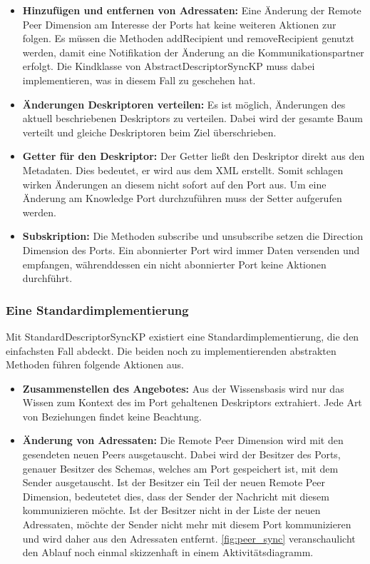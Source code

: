 \documentclass[a4paper]{article}
\begin{document}
	\begin{itemize}
		\item \textbf{Hinzufügen und entfernen von Adressaten:} Eine Änderung
		der Remote Peer Dimension am Interesse der Ports hat keine weiteren
		Aktionen zur folgen. Es müssen die Methoden addRecipient und
		removeRecipient genutzt werden, damit eine Notifikation
		der Änderung an die Kommunikationspartner erfolgt. Die Kindklasse von
		AbstractDescriptorSyncKP muss dabei implementieren, was in diesem
		Fall zu geschehen hat.
		\item \textbf{Änderungen Deskriptoren verteilen:} Es ist möglich, 
		Änderungen des aktuell beschriebenen Deskriptors zu verteilen. Dabei 
		wird der gesamte Baum verteilt und gleiche Deskriptoren beim
		Ziel überschrieben.
		\item \textbf{Getter für den Deskriptor:} Der Getter ließt den 
		Deskriptor direkt aus den Metadaten. Dies bedeutet, er wird aus dem XML
		erstellt. Somit schlagen wirken Änderungen an diesem nicht sofort auf
		den Port aus. Um eine Änderung am Knowledge Port durchzuführen muss der
		Setter aufgerufen werden.
		\item \textbf{Subskription:} Die Methoden subscribe und unsubscribe setzen
		die Direction Dimension des Ports. Ein abonnierter Port wird immer Daten
		versenden und empfangen, währenddessen ein nicht abonnierter Port keine
		Aktionen durchführt.
	\end{itemize}
	
	\subsubsection{Eine Standardimplementierung}
	
	Mit StandardDescriptorSyncKP existiert eine Standardimplementierung, die
	den einfachsten Fall abdeckt. Die beiden noch zu implementierenden
	abstrakten Methoden führen folgende Aktionen aus.
	
	\begin{itemize}
		\item \textbf{Zusammenstellen des Angebotes:} Aus der Wissensbasis
		wird nur das Wissen zum Kontext des im Port gehaltenen Deskriptors
		extrahiert. Jede Art von Beziehungen findet keine Beachtung.
		\item \textbf{Änderung von Adressaten:} Die Remote Peer Dimension 
		wird mit den gesendeten neuen Peers ausgetauscht. Dabei wird
		der Besitzer des Ports, genauer Besitzer des Schemas, welches am Port
		gespeichert ist, mit dem Sender ausgetauscht. Ist der Besitzer ein Teil 
		der neuen Remote Peer Dimension, bedeutetet dies, dass der Sender der
		Nachricht mit diesem kommunizieren möchte. Ist der Besitzer nicht in der
		Liste der neuen Adressaten, möchte der Sender nicht mehr mit diesem Port
		kommunizieren und wird daher aus den Adressaten entfernt.
		\autoref{fig:peer_sync} veranschaulicht den Ablauf noch einmal
		skizzenhaft in einem Aktivitätsdiagramm.
	\end{itemize}
	
\end{document}
